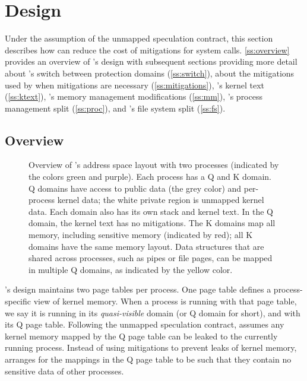 \section*{Design}
\label{s:design}

Under the assumption of the unmapped speculation contract, this
section describes how \sys can reduce the cost of mitigations for
system calls.  \autoref{ss:overview} provides an overview of \sys's
design with subsequent sections providing more detail about \sys's
switch between protection domains (\autoref{ss:switch}), about the
mitigations used by \sys when mitigations are necessary
(\autoref{ss:mitigations}), \sys's kernel text (\autoref{ss:ktext}),
\sys's memory management modifications (\autoref{ss:mm}), \sys's
process management split (\autoref{ss:proc}), and \sys's file system
split (\autoref{ss:fs}).

\subsection*{Overview}
\label{ss:overview}

\begin{figure}[t]
  \begin{center}
    
  \end{center}
  \vspace{-2\baselineskip}
  \caption{Overview of \sys's address space layout with two processes
    (indicated by the colors green and purple). Each process has a Q
    and K domain. Q domains have access to public data (the grey
    color) and per-process kernel data; the
    white private region is unmapped kernel data. Each domain also has
    its own stack and kernel text. In the Q domain, the kernel text
    has no mitigations. The K domains map all memory, including
    sensitive memory (indicated by red); all K domains have the same
    memory layout. Data structures that are shared across processes,
    such as pipes or file pages, can be mapped in multiple Q domains,
    as indicated by the yellow color.}
\label{fig:overview}
\end{figure}

\sys's design maintains two page tables per process.  One page table
defines a process-specific view of kernel memory.  When a process is
running with that page table, we say it is running in its
\textit{quasi-visible} domain (or Q domain for short), and with its Q page
table.  Following the unmapped speculation contract, \sys assumes any
kernel memory mapped by the Q page table can be leaked to the
currently running process.  Instead of using mitigations to prevent
leaks of kernel memory, \sys arranges for the mappings in the Q page
table to be such that they contain no sensitive data of other
processes.

